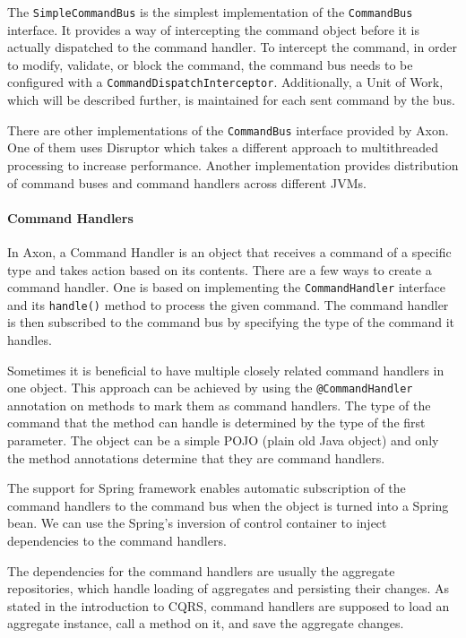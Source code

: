 \documentclass{book}
\begin{document}
The \texttt{SimpleCommandBus} is the simplest implementation of the
\texttt{CommandBus} interface. It provides a way of intercepting the
command object before it is actually dispatched to the command handler.
To intercept the command, in order to modify, validate, or block the
command, the command bus needs to be configured with a
\texttt{CommandDispatchInterceptor}. Additionally, a Unit of Work, which
will be described further, is maintained for each sent command by the
bus.

There are other implementations of the \texttt{CommandBus} interface
provided by Axon. One of them uses Disruptor \cite{disruptor} which
takes a different approach to multithreaded processing to increase
performance. Another implementation provides distribution of command
buses and command handlers across different JVMs.

\paragraph{Command Handlers}\label{command-handlers}

In Axon, a Command Handler is an object that receives a command of a
specific type and takes action based on its contents. There are a few
ways to create a command handler. One is based on implementing the
\texttt{CommandHandler} interface and its \texttt{handle()} method to
process the given command. The command handler is then subscribed to the
command bus by specifying the type of the command it handles.

Sometimes it is beneficial to have multiple closely related command
handlers in one object. This approach can be achieved by using the
\texttt{@CommandHandler} annotation on methods to mark them as command
handlers. The type of the command that the method can handle is
determined by the type of the first parameter. The object can be a
simple POJO (plain old Java object) and only the method annotations
determine that they are command handlers.

The support for Spring framework enables automatic subscription of the
command handlers to the command bus when the object is turned into a
Spring bean. We can use the Spring's inversion of control container to
inject dependencies to the command handlers.

The dependencies for the command handlers are usually the aggregate
repositories, which handle loading of aggregates and persisting their
changes. As stated in the introduction to CQRS, command handlers are
supposed to load an aggregate instance, call a method on it, and save
the aggregate changes.
\end{document}
